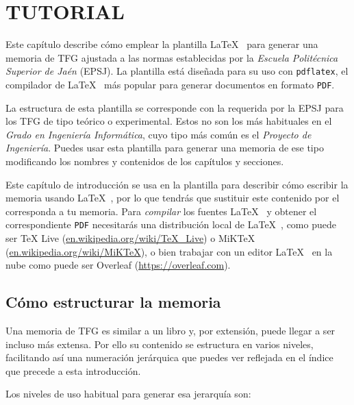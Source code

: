 
\chapter{TUTORIAL}  

Este capítulo describe cómo emplear la plantilla \LaTeX~ para generar una memoria de TFG ajustada a las normas establecidas por la \textit{Escuela Politécnica Superior de Jaén} (EPSJ). La plantilla está diseñada para su uso con \verb*|pdflatex|, el compilador de \LaTeX~ más popular para generar documentos en formato \verb*|PDF|.

La estructura de esta plantilla se corresponde con la requerida por la EPSJ para los TFG de tipo teórico o experimental. Estos no son los más habituales en el \textit{Grado en Ingeniería Informática}, cuyo tipo más común es el \textit{Proyecto de Ingeniería}. Puedes usar esta plantilla para generar una memoria de ese tipo modificando los nombres y contenidos de los capítulos y secciones.

Este capítulo de introducción se usa en la plantilla para describir cómo escribir la memoria usando \LaTeX~, por lo que tendrás que sustituir este contenido por el corresponda a tu memoria. Para \textit{compilar} los fuentes \LaTeX~ y obtener el correspondiente \verb*|PDF| necesitarás una distribución local de \LaTeX~, como puede ser TeX Live (\url{en.wikipedia.org/wiki/TeX\_Live}) o MiKTeX (\url{en.wikipedia.org/wiki/MiKTeX}), o bien trabajar con un editor \LaTeX~ en la nube como puede ser Overleaf (\url{https://overleaf.com}).

\section{Cómo estructurar la memoria}

Una memoria de TFG es similar a un libro y, por extensión, puede llegar a ser incluso más extensa. Por ello su contenido se estructura en varios niveles, facilitando así una numeración jerárquica que puedes ver reflejada en el índice que precede a esta introducción. 

Los niveles de uso habitual para generar esa jerarquía son:


